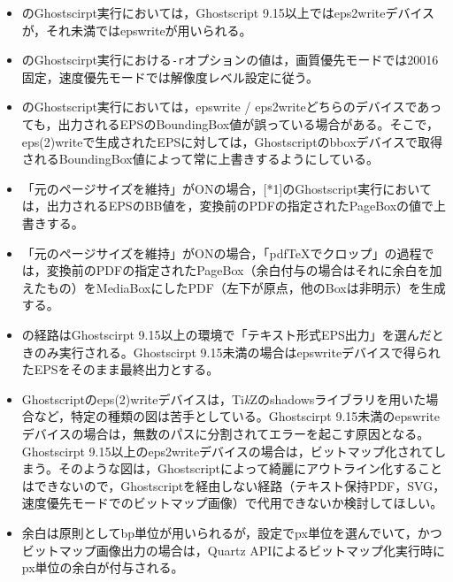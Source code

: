 \documentclass[uplatex,dvipdfmx,a3paper,landscape]{jsarticle}
\newcommand*\TikZ{Ti\textit{k}Z}
\begin{document}
{\baselineskip18pt
\begin{itemize}[leftmargin=2zw]
\item\relax[*1]のGhostscirpt実行においては，Ghostscript 9.15以上ではeps2writeデバイスが，それ未満ではepswriteが用いられる。
\item\relax[*1]のGhostscirpt実行における\texttt{-r}オプションの値は，画質優先モードでは20016固定，速度優先モードでは解像度レベル設定に従う。
\item\relax[*1]のGhostscript実行においては，epswrite / eps2writeどちらのデバイスであっても，出力されるEPSのBoundingBox値が誤っている場合がある。そこで，eps(2)writeで生成されたEPSに対しては，Ghostscriptのbboxデバイスで取得されるBoundingBox値によって常に上書きするようにしている。
\item 「元のページサイズを維持」がONの場合，[*1]のGhostscript実行においては，出力されるEPSのBB値を，変換前のPDFの指定されたPageBoxの値で上書きする。
\item 「元のページサイズを維持」がONの場合，「pdf\TeX でクロップ」の過程では，変換前のPDFの指定されたPageBox（余白付与の場合はそれに余白を加えたもの）をMediaBoxにしたPDF（左下が原点，他のBoxは非明示）を生成する。
\item\relax[*2]の経路はGhostscirpt 9.15以上の環境で「テキスト形式EPS出力」を選んだときのみ実行される。Ghostscirpt 9.15未満の場合はepswriteデバイスで得られたEPSをそのまま最終出力とする。
\item Ghostscriptのeps(2)writeデバイスは，\TikZ のshadowsライブラリを用いた場合など，特定の種類の図は苦手としている。Ghostscirpt 9.15未満のepswriteデバイスの場合は，無数のパスに分割されてエラーを起こす原因となる。Ghostscirpt 9.15以上のeps2writeデバイスの場合は，ビットマップ化されてしまう。そのような図は，Ghostscriptによって綺麗にアウトライン化することはできないので，Ghostscriptを経由しない経路（テキスト保持PDF，SVG，速度優先モードでのビットマップ画像）で代用できないか検討してほしい。
\item 余白は原則としてbp単位が用いられるが，設定でpx単位を選んでいて，かつビットマップ画像出力の場合は，Quartz APIによるビットマップ化実行時にpx単位の余白が付与される。
\end{itemize}
}
\end{document}
